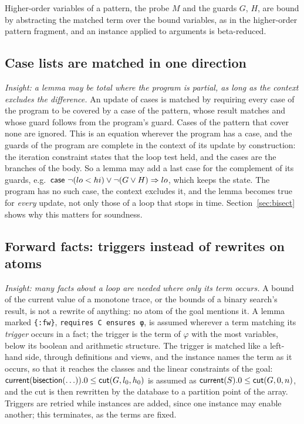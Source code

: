 Higher-order variables of a pattern, the probe $M$ and the guards $G$, $H$, are bound by abstracting the
matched term over the bound variables, as in the higher-order pattern fragment, and an instance applied to
arguments is beta-reduced.

\subsection{Case lists are matched in one direction}\label{sec:engine:cases}
\emph{Insight: a lemma may be total where the program is partial, as long as the context excludes the
difference.} An update of cases is matched by requiring every case of the program to be covered by a case of
the pattern, whose result matches and whose guard follows from the program's guard. Cases of the pattern that
cover none are ignored. This is an equation wherever the program has a case, and the guards of the program are
complete in the context of its update by construction: the iteration constraint states that the loop test
held, and the cases are the branches of the body. So a lemma may add a last case for the complement of its
guards, e.g.\ $\mathsf{case}\ \neg(lo < hi) \vee \neg(G \vee H) \Rightarrow lo$, which keeps the state. The program has no such
case, the context excludes it, and the lemma becomes true for \emph{every} update, not only those of a loop
that stops in time. Section~\ref{sec:bisect} shows why this matters for soundness.

\subsection{Forward facts: triggers instead of rewrites on atoms}\label{sec:engine:forward}
\emph{Insight: many facts about a loop are needed where only its term occurs.} A bound of the current value of
a monotone trace, or the bounds of a binary search's result, is not a rewrite of anything: no atom of the goal
mentions it. A lemma marked \texttt{\{:fw\}}, \texttt{requires C ensures φ}, is assumed wherever a term matching
its \emph{trigger} occurs in a fact; the trigger is the term of $\varphi$ with the most variables, below its
boolean and arithmetic structure. The trigger is matched like a left-hand side, through definitions and views,
and the instance names the term as it occurs, so that it reaches the classes and the linear constraints of the
goal: $\mathsf{current}(\mathsf{bisection}(\ldots)).0 \le \mathsf{cut}(G, l_0, h_0)$ is assumed as
$\mathsf{current}(S).0 \le \mathsf{cut}(G, 0, n)$, and the cut is then rewritten by the database to a partition point of
the array. Triggers are retried while instances are added, since one instance may enable another; this
terminates, as the terms are fixed.

